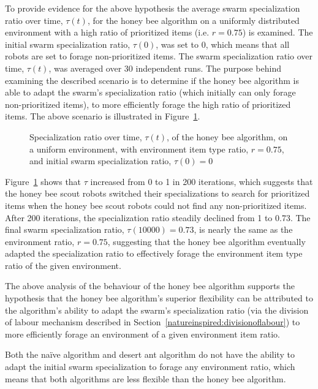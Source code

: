To provide evidence for the above hypothesis the average swarm specialization ratio over time, $\tau(t)$, for the honey bee algorithm on a uniformly distributed environment with a high ratio of prioritized items (i.e. $r = 0.75$) is examined. The initial swarm specialization ratio, $\tau(0)$, was set to 0, which means that all robots are set to forage non-prioritized items. The swarm specialization ratio over time, $\tau(t)$, was averaged over 30 independent runs. The purpose behind examining the described scenario is to determine if the honey bee algorithm is able to adapt the swarm's specialization ratio (which initially can only forage non-prioritized items), to more efficiently forage the high ratio of prioritized items. The above scenario is illustrated in Figure~\ref{fig:specializationratioovertime}. 


\begin{figure}[!htb]
\centering
\resizebox{\textwidth}{!}{}
\caption{Specialization ratio over time, $\tau(t)$, of the honey bee algorithm, on a uniform environment, with environment item type ratio, $r=0.75$, and initial swarm specialization ratio, $\tau(0)=0$}
\label{fig:specializationratioovertime}
\end{figure}

Figure~\ref{fig:specializationratioovertime} shows that $\tau$ increased from 0 to 1 in 200 iterations, which suggests that the honey bee scout robots switched their specializations to search for prioritized items when the honey bee scout robots could not find any non-prioritized items. After 200 iterations, the specialization ratio steadily declined from 1 to 0.73. The final swarm specialization ratio, $\tau(10000)=0.73$, is nearly the same as the environment ratio, $r=0.75$, suggesting that the honey bee algorithm eventually adapted the specialization ratio to effectively forage the environment item type ratio of the given environment.

The above analysis of the behaviour of the honey bee algorithm supports the hypothesis that the honey bee algorithm's superior flexibility can be attributed to the algorithm's ability to adapt the swarm's specialization ratio (via the division of labour mechanism described in Section~\ref{natureinspired:divisionoflabour}) to more efficiently forage an environment of a given environment item ratio.

Both the na\"ive algorithm and desert ant algorithm do not have the ability to adapt the initial swarm specialization to forage any environment ratio, which means that both algorithms are  less flexible than the honey bee algorithm. 

